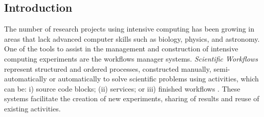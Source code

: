\documentclass[40pt, a0, portrait]{a0poster}
\begin{document}
\begin{multicols}{2} %


%
%
%
%


\color{Navy} %

\section*{Introduction}

The number of research projects using intensive computing has been growing in areas that lack advanced computer skills such as biology, physics, and astronomy. One of the tools to assist in the management and construction of intensive computing experiments are the workflows manager systems. \emph{Scientific Workflows} represent structured and ordered processes, constructed manually, semi-automatically or automatically to solve scientific problems using activities, which can be: i) source code blocks; (ii) services; or iii) finished workflows \cite{Wang2010}. These systems facilitate the creation of new experiments, sharing of results and reuse of existing activities.


\end{multicols}
\end{document}
